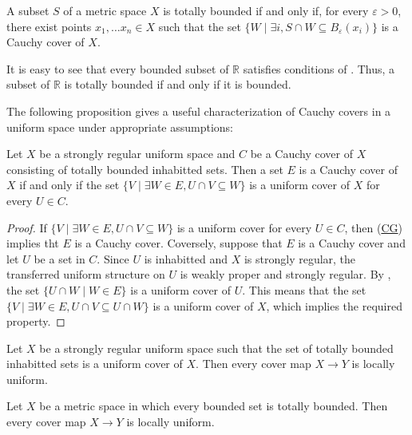 \documentclass[reqno]{amsart}
\newcommand{\axref}[1]{(\hyperref[ax:#1]{#1})}
\theoremstyle{definition}
\theoremstyle{remark}
\numberwithin{figure}{section}
\begin{document}
\begin{cor}[tb-metric]
A subset $S$ of a metric space $X$ is totally bounded if and only if, for every $\varepsilon > 0$, there exist points $x_1, \ldots x_n \in X$ such that the set $\{ W \mid \exists i, S \cap W \subseteq B_\varepsilon(x_i) \}$ is a Cauchy cover of $X$.
\end{cor}

\begin{example}
It is easy to see that every bounded subset of $\mathbb{R}$ satisfies conditions of .
Thus, a subset of $\mathbb{R}$ is totally bounded if and only if it is bounded.
\end{example}

The following proposition gives a useful characterization of Cauchy covers in a uniform space under appropriate assumptions:

\begin{prop}
Let $X$ be a strongly regular uniform space and $C$ be a Cauchy cover of $X$ consisting of totally bounded inhabitted sets.
Then a set $E$ is a Cauchy cover of $X$ if and only if the set $\{ V \mid \exists W \in E, U \cap V \subseteq W \}$ is a uniform cover of $X$ for every $U \in C$.
\end{prop}
\begin{proof}
If $\{ V \mid \exists W \in E, U \cap V \subseteq W \}$ is a uniform cover for every $U \in C$, then \axref{CG} implies tht $E$ is a Cauchy cover.
Coversely, suppose that $E$ is a Cauchy cover and let $U$ be a set in $C$.
Since $U$ is inhabitted and $X$ is strongly regular, the transferred uniform structure on $U$ is weakly proper and strongly regular.
By , the set $\{ U \cap W \mid W \in E \}$ is a uniform cover of $U$.
This means that the set $\{ V \mid \exists W \in E, U \cap V \subseteq U \cap W \}$ is a uniform cover of $X$, which implies the required property.
\end{proof}

\begin{cor}
Let $X$ be a strongly regular uniform space such that the set of totally bounded inhabitted sets is a uniform cover of $X$.
Then every cover map $X \to Y$ is locally uniform.
\end{cor}

\begin{cor}
Let $X$ be a metric space in which every bounded set is totally bounded.
Then every cover map $X \to Y$ is locally uniform.
\end{cor}
\end{document}
